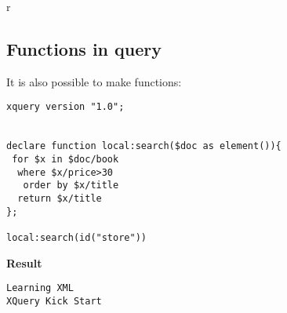 r%

\subsection{Functions in query}
It is also possible to make functions:
\begin{lstlisting}[frame=single, style=code, caption={query 2}]
xquery version "1.0";
 
 
declare function local:search($doc as element()){
 for $x in $doc/book
  where $x/price>30
   order by $x/title
  return $x/title
};
 
local:search(id("store"))
\end{lstlisting}
\textbf{Result}
\begin{lstlisting}[frame=single, caption={result}]
Learning XML
XQuery Kick Start
\end{lstlisting}
